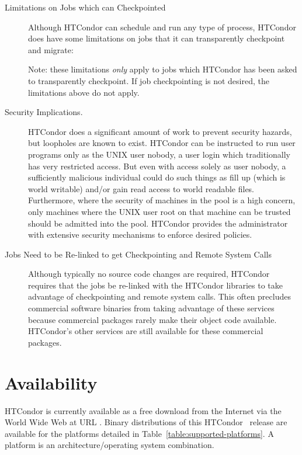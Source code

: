 \begin{description}

	\item[Limitations on Jobs which can Checkpointed] Although HTCondor can schedule and
run any type of process, HTCondor does have some limitations on jobs that it can
transparently checkpoint and migrate:



	Note: these limitations \emph{only} apply to jobs which HTCondor
has been asked to transparently checkpoint.  If job checkpointing is not
desired, the limitations above do not apply.

	\item[Security Implications.] HTCondor does a significant amount of
	work to prevent security hazards, but loopholes are known to exist.
	HTCondor can be instructed to run user programs only as the UNIX
	user nobody, a user login which traditionally has very 
	restricted access.
	But even with access solely as user nobody,
	a sufficiently malicious individual could do such things as fill up
	 (which is world writable) and/or gain read access to
	world readable files.
	Furthermore, where the security of machines in the pool is a
	high concern, 
	only machines where the UNIX user root on that machine can be
	trusted should be admitted into the pool.
	HTCondor provides the administrator with extensive security mechanisms 
	to enforce desired policies.

	\item[Jobs Need to be Re-linked to get Checkpointing and Remote System Calls] Although 
typically no source code changes are required,
HTCondor requires
that the jobs be re-linked with the HTCondor libraries to take
advantage of checkpointing and remote system calls. This often
precludes commercial software binaries from taking advantage of these services
because commercial packages rarely make their object code
available. 
HTCondor's other services are still available for these commercial packages.

\end{description}

\section{\label{sec:Availability}Availability}
HTCondor is currently available as a free download from the Internet via the World Wide Web at  
URL .
Binary distributions of this HTCondor \VersionNotice\ release
are available for the platforms 
detailed in Table~\ref{table:supported-platforms}.  A platform is an 
architecture/operating system combination.  

